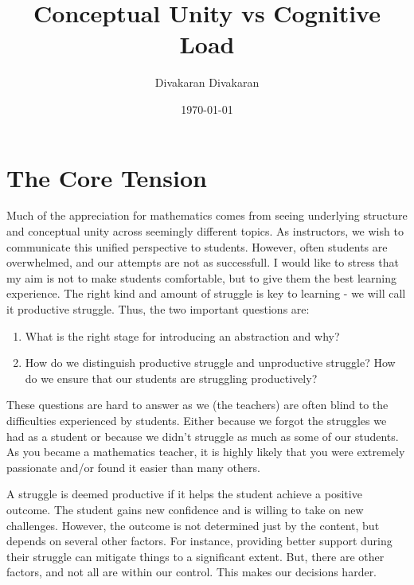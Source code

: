 \documentclass[12pt]{amsart}
\title{\textbf{Conceptual Unity vs Cognitive Load}}
\author{Divakaran Divakaran}
\date{\today}
\begin{document}


\maketitle

\section{The Core Tension}
Much of the appreciation for mathematics comes from seeing underlying structure and conceptual unity across seemingly different topics. As instructors, we wish to communicate this unified perspective to students. However, often students are overwhelmed, and our attempts are not as successfull.  I would like to stress that my aim is not to make students comfortable, but to give them the best learning experience.  The right kind and amount of struggle is key to learning - we will call it productive struggle.  Thus, the two important questions are: 
\begin{enumerate}
    \item What is the right stage for introducing an abstraction and why?
    \item How do we distinguish productive struggle and unproductive struggle?  How do we ensure that our students are struggling productively?
\end{enumerate}
These questions are hard to answer as we (the teachers) are often blind to the difficulties experienced by students.  Either because we forgot the struggles we had as a student or because we didn't struggle as much as some of our students.  As you became a mathematics teacher, it is highly likely that you were extremely passionate and/or found it easier than many others.  

A struggle is deemed productive if it helps the student achieve a positive outcome.  The student gains new confidence and is willing to take on new challenges.  However, the outcome is not determined just by the content, but depends on several other factors.  For instance, providing better support during their struggle can mitigate things to a significant extent.  But, there are other factors, and not all are within our control.  This makes our decisions harder.  
\end{document}

